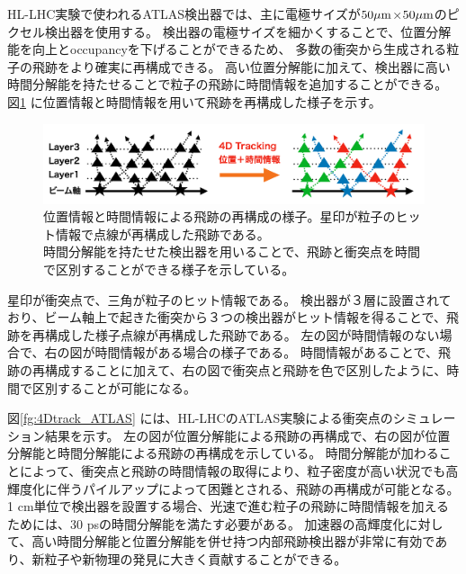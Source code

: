HL-LHC実験で使われるATLAS検出器では、主に電極サイズが$50 \mu\rm{m}$×$50 \mu\rm{m}$のピクセル検出器を使用する。
検出器の電極サイズを細かくすることで、位置分解能を向上とoccupancyを下げることができるため、
多数の衝突から生成される粒子の飛跡をより確実に再構成できる。
高い位置分解能に加えて、検出器に高い時間分解能を持たせることで粒子の飛跡に時間情報を追加することができる。
図\ref{fg:4DTracking} に位置情報と時間情報を用いて飛跡を再構成した様子を示す。
\begin{figure}[h]
    \centering
    \includegraphics[width=16cm]{fig/ch1/4DTracking_new.png}
    \caption[位置情報と時間情報による飛跡の再構成の様子]{位置情報と時間情報による飛跡の再構成の様子。星印が粒子のヒット情報で点線が再構成した飛跡である。\\時間分解能を持たせた検出器を用いることで、飛跡と衝突点を時間で区別することができる様子を示している。}
    \label{fg:4DTracking}
\end{figure}
星印が衝突点で、三角が粒子のヒット情報である。
検出器が３層に設置されており、ビーム軸上で起きた衝突から３つの検出器がヒット情報を得ることで、飛跡を再構成した様子点線が再構成した飛跡である。
左の図が時間情報のない場合で、右の図が時間情報がある場合の様子である。
時間情報があることで、飛跡の再構成することに加えて、右の図で衝突点と飛跡を色で区別したように、時間で区別することが可能になる。

図\ref{fg:4Dtrack_ATLAS} には、HL-LHCのATLAS実験による衝突点のシミュレーション結果を示す\cite{ATL-PHYS-PUB-2023-023}。
左の図が位置分解能による飛跡の再構成で、右の図が位置分解能と時間分解能による飛跡の再構成を示している。
時間分解能が加わることによって、衝突点と飛跡の時間情報の取得により、粒子密度が高い状況でも高輝度化に伴うパイルアップによって困難とされる、飛跡の再構成が可能となる。
1 cm単位で検出器を設置する場合、光速で進む粒子の飛跡に時間情報を加えるためには、30 psの時間分解能を満たす必要がある。
加速器の高輝度化に対して、高い時間分解能と位置分解能を併せ持つ内部飛跡検出器が非常に有効であり、新粒子や新物理の発見に大きく貢献することができる。

